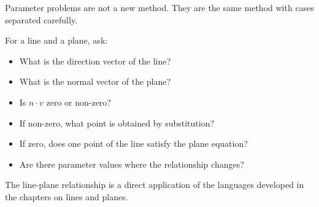 Parameter problems are not a new method. They are the same method with cases separated carefully.

\begin{summarybox}
For a line and a plane, ask:
\begin{itemize}
\item What is the direction vector of the line?
\item What is the normal vector of the plane?
\item Is \(n\cdot v\) zero or non-zero?
\item If non-zero, what point is obtained by substitution?
\item If zero, does one point of the line satisfy the plane equation?
\item Are there parameter values where the relationship changes?
\end{itemize}
\end{summarybox}

The line-plane relationship is a direct application of the languages developed in the chapters on lines and planes.
